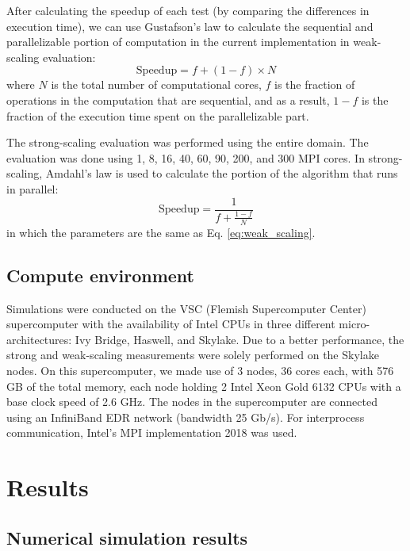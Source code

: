 After calculating the speedup of each test (by comparing the differences in execution time), we can use Gustafson’s law \cite{Gustafson1988} to calculate the sequential and parallelizable portion of computation in the current implementation in weak-scaling evaluation:
\begin{equation} \label{eq:weak_scaling}
\mathrm{Speedup} = f + (1-f) \times N
\end{equation}
where $N$ is the total number of computational cores, $f$ is the fraction of operations in the computation that are sequential, and as a result, $1-f$ is the fraction of the execution time spent on the parallelizable part.

The strong-scaling evaluation was performed using the entire domain. The evaluation was done using 1, 8, 16, 40, 60, 90, 200, and 300 {MPI} cores. In strong-scaling, Amdahl’s law \cite{Amdahl1967} is used to calculate the portion of the algorithm that runs in parallel:
\begin{equation} \label{eq:strong_scaling}
\mathrm{Speedup} = \frac{1}{f + \frac{1-f}{N}}
\end{equation}
in which the parameters are the same as Eq. \ref{eq:weak_scaling}.


\subsection{Compute environment}

Simulations were conducted on the VSC (Flemish Supercomputer Center) supercomputer with the availability of Intel {CPU}s in three different micro-architectures: Ivy Bridge, Haswell, and Skylake. Due to a better performance, the strong and weak-scaling measurements were solely performed on the Skylake nodes. On this supercomputer, we made use of 3 nodes, 36 cores each, with 576 GB of the total memory, each node holding 2 Intel Xeon Gold 6132 {CPU}s with a base clock speed of 2.6 GHz. The nodes in the supercomputer are connected using an InfiniBand EDR network (bandwidth 25 Gb/s). For interprocess communication, Intel's {MPI} implementation 2018 was used.


\section{Results}

\subsection{Numerical simulation results}

